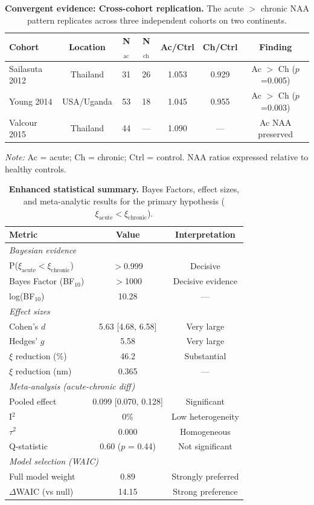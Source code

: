 \documentclass[10pt,a4paper]{article}
\begin{document}
\begin{table}[htbp]
\centering
\caption{\textbf{Convergent evidence: Cross-cohort replication.} The acute $>$ chronic NAA pattern replicates across three independent cohorts on two continents.}
\label{tab:convergent_cohorts}
\small
\begin{tabular}{lcccccc}
\toprule
\textbf{Cohort} & \textbf{Location} & \textbf{N$_{\text{ac}}$} & \textbf{N$_{\text{ch}}$} & \textbf{Ac/Ctrl} & \textbf{Ch/Ctrl} & \textbf{Finding} \\
\midrule
Sailasuta 2012 & Thailand & 31 & 26 & 1.053 & 0.929 & Ac $>$ Ch ($p$=0.005) \\
Young 2014 & USA/Uganda & 53 & 18 & 1.045 & 0.955 & Ac $>$ Ch ($p$=0.003) \\
Valcour 2015 & Thailand & 44 & --- & 1.090 & --- & Ac NAA preserved \\
\bottomrule
\end{tabular}
\smallskip

\noindent\textit{Note:} Ac = acute; Ch = chronic; Ctrl = control. NAA ratios expressed relative to healthy controls.
\end{table}

\begin{table}[htbp]
\centering
\caption{\textbf{Enhanced statistical summary.} Bayes Factors, effect sizes, and meta-analytic results for the primary hypothesis ($\xi_{\text{acute}} < \xi_{\text{chronic}}$).}
\label{tab:statistics}
\begin{tabular}{lcc}
\toprule
\textbf{Metric} & \textbf{Value} & \textbf{Interpretation} \\
\midrule
\multicolumn{3}{l}{\textit{Bayesian evidence}} \\
P($\xi_{\text{acute}} < \xi_{\text{chronic}}$) & $>$0.999 & Decisive \\
Bayes Factor (BF$_{10}$) & $>$1000 & Decisive evidence \\
log(BF$_{10}$) & 10.28 & --- \\
\midrule
\multicolumn{3}{l}{\textit{Effect sizes}} \\
Cohen's $d$ & 5.63 [4.68, 6.58] & Very large \\
Hedges' $g$ & 5.58 & Very large \\
$\xi$ reduction (\%) & 46.2 & Substantial \\
$\xi$ reduction (nm) & 0.365 & --- \\
\midrule
\multicolumn{3}{l}{\textit{Meta-analysis (acute-chronic diff)}} \\
Pooled effect & 0.099 [0.070, 0.128] & Significant \\
I$^2$ & 0\% & Low heterogeneity \\
$\tau^2$ & 0.000 & Homogeneous \\
Q-statistic & 0.60 ($p$ = 0.44) & Not significant \\
\midrule
\multicolumn{3}{l}{\textit{Model selection (WAIC)}} \\
Full model weight & 0.89 & Strongly preferred \\
$\Delta$WAIC (vs null) & 14.15 & Strong preference \\
\bottomrule
\end{tabular}
\end{table}
\end{document}
